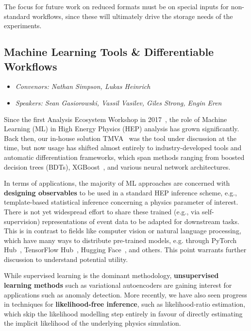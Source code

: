 \documentclass[a4paper,11pt]{article}
\begin{document}
The focus for future work on reduced formats must be on special inputs
for non-standard workflows, since these will ultimately drive the
storage needs of the experiments.

\hypertarget{machine-learning-tools-differentiable-workflows}{%
\subsection{Machine Learning Tools \& Differentiable
Workflows}\label{machine-learning-tools-differentiable-workflows}}

\begin{itemize}
    \item \emph{Convenors: Nathan Simpson, Lukas Heinrich}
    \item \emph{Speakers: Sean Gasiorowski, Vassil Vasilev, Giles Strong, Engin Eren}
\end{itemize}

Since the first Analysis Ecosystem Workshop in 2017~\cite{AEIWS}, the role of Machine
Learning (ML) in High Energy Physics (HEP) analysis has grown
significantly. Back then, our in-house solution TMVA~\cite{TMVA} was the tool under
discussion at the time, but now usage has shifted almost entirely to
industry-developed tools and automatic differentiation frameworks, which
span methods ranging from boosted decision trees (BDTs), XGBoost~\cite{XGBoost}, and
various neural network architectures.

In terms of applications, the majority of ML approaches are concerned
with \textbf{designing observables} to be used in a standard HEP
inference scheme, e.g., template-based statistical inference concerning
a physics parameter of interest. There is not yet widespread effort to
share these trained (e.g., via self-supervision) representations of
event data to be adapted for downstream tasks. This is in contrast to
fields like computer vision or natural language processing, which have
many ways to distribute pre-trained models, e.g. through
PyTorch Hub~\cite{PyTorchHub},
TensorFlow Hub~\cite{TFHub},
Hugging Face~\cite{huggingface}, and others. This
point warrants further discussion to understand potential utility.

While supervised learning is the dominant methodology,
\textbf{unsupervised learning methods} such as variational autoencoders
are gaining interest for applications such as anomaly detection. More
recently, we have also seen progress in techniques for
\textbf{likelihood-free inference}, such as likelihood-ratio estimation,
which skip the likelihood modelling step entirely in favour of directly
estimating the implicit likelihood of the underlying physics simulation.
\end{document}
